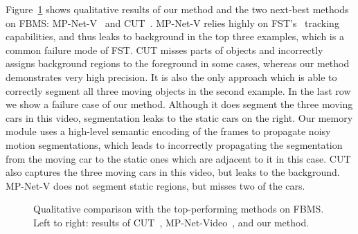 Figure~\ref{fig:fbms} shows qualitative results of our method and the two
next-best methods on FBMS: MP-Net-V~\cite{tokmakov2016learning} and
CUT~\cite{keuper2015motion}. MP-Net-V relies highly on
FST's~\cite{papazoglou2013fast} tracking capabilities, and thus leaks
to background in the top three examples, which is a common failure mode of FST.
CUT misses parts of objects and incorrectly assigns background regions to the
foreground in some cases, whereas our method demonstrates very high precision. It is also the only approach which is able to correctly segment all three moving objects in the second example. In the last row we show a failure case of our method. Although it does segment the three moving cars in this video, segmentation leaks to the static cars on the right. Our memory module uses a high-level semantic encoding of the frames to propagate noisy motion segmentations, which leads to incorrectly propagating the segmentation from the moving car to the static ones which are adjacent to it in this case. CUT also captures the three moving cars in this video, but leaks to the background. MP-Net-V does not segment static regions, but misses two of the cars.
\begin{figure}[t]
\begin{center}
\vspace{0.1cm}
\vspace{0.1cm}
\vspace{0.1cm}
\end{center}
\vspace{-0.3cm}\caption{Qualitative comparison with the top-performing methods
on FBMS. Left to right: results of CUT~\cite{keuper2015motion},
MP-Net-Video~\cite{tokmakov2016learning}, and our method.}
\label{fig:fbms}
\end{figure}

